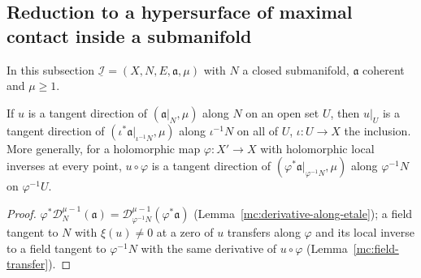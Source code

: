 \subsection{Reduction to a hypersurface of maximal contact inside a submanifold}

In this subsection \(\underline{\mathcal I}=(X,N,E,\mathfrak a,\mu)\) with \(N\) a closed submanifold, \(\mathfrak a\) coherent and \(\mu\ge1\).

\begin{lemma}
\label{mc:tangent-direction-along-open}
\leanok
If \(u\) is a tangent direction of \((\mathfrak a|_N,\mu)\) along \(N\) on an open set \(U\), then \(u|_U\) is a tangent direction of \((\iota^*\mathfrak a|_{\iota^{-1}N},\mu)\) along
\(\iota^{-1}N\) on all of \(U\), \(\iota\colon U\to X\) the inclusion. More generally, for a holomorphic map \(\varphi\colon X'\to X\) with holomorphic local inverses at
every point, \(u\circ\varphi\) is a tangent direction of \((\varphi^*\mathfrak a|_{\varphi^{-1}N},\mu)\) along \(\varphi^{-1}N\) on \(\varphi^{-1}U\).
\end{lemma}
\begin{proof}
\leanok
\(\varphi^*\mathcal D_N^{\mu-1}(\mathfrak a)=\mathcal D_{\varphi^{-1}N}^{\mu-1}(\varphi^*\mathfrak a)\) (Lemma~\ref{mc:derivative-along-etale}); a field tangent to \(N\) with \(\xi(u)\ne0\) at a
zero of \(u\) transfers along \(\varphi\) and its local inverse to a field tangent to \(\varphi^{-1}N\) with the same derivative of \(u\circ\varphi\)
(Lemma~\ref{mc:field-transfer}).
\end{proof}

